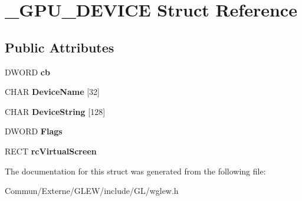 \hypertarget{struct___g_p_u___d_e_v_i_c_e}{}\section{\+\_\+\+G\+P\+U\+\_\+\+D\+E\+V\+I\+CE Struct Reference}
\label{struct___g_p_u___d_e_v_i_c_e}
\subsection*{Public Attributes}
\begin{DoxyCompactItemize}
\item 
D\+W\+O\+RD {\bfseries cb}\hypertarget{struct___g_p_u___d_e_v_i_c_e_afcb22f16ba9e526610489ff56ab78ddb}{}\label{struct___g_p_u___d_e_v_i_c_e_afcb22f16ba9e526610489ff56ab78ddb}

\item 
C\+H\+AR {\bfseries Device\+Name} \mbox{[}32\mbox{]}\hypertarget{struct___g_p_u___d_e_v_i_c_e_a604bfab61f1a2c5d1e635837d369ba14}{}\label{struct___g_p_u___d_e_v_i_c_e_a604bfab61f1a2c5d1e635837d369ba14}

\item 
C\+H\+AR {\bfseries Device\+String} \mbox{[}128\mbox{]}\hypertarget{struct___g_p_u___d_e_v_i_c_e_aff8b7920ccc85afcd6f325da6cdb0b73}{}\label{struct___g_p_u___d_e_v_i_c_e_aff8b7920ccc85afcd6f325da6cdb0b73}

\item 
D\+W\+O\+RD {\bfseries Flags}\hypertarget{struct___g_p_u___d_e_v_i_c_e_a008db9d0f5fc13a5160805f40465f14a}{}\label{struct___g_p_u___d_e_v_i_c_e_a008db9d0f5fc13a5160805f40465f14a}

\item 
R\+E\+CT {\bfseries rc\+Virtual\+Screen}\hypertarget{struct___g_p_u___d_e_v_i_c_e_aeb573bbeb3b6c589246720ef259b9a27}{}\label{struct___g_p_u___d_e_v_i_c_e_aeb573bbeb3b6c589246720ef259b9a27}

\end{DoxyCompactItemize}


The documentation for this struct was generated from the following file\+:\begin{DoxyCompactItemize}
\item 
Commun/\+Externe/\+G\+L\+E\+W/include/\+G\+L/wglew.\+h\end{DoxyCompactItemize}
